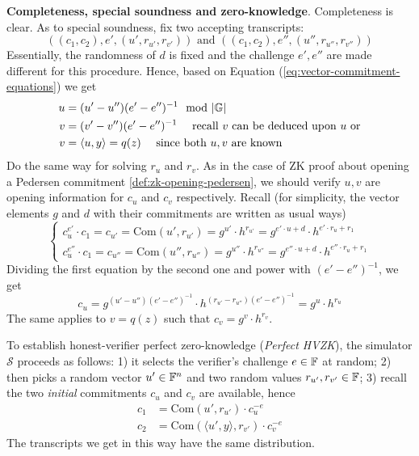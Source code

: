\documentclass{article}
\begin{document}
\textbf{Completeness, special soundness and zero-knowledge}. Completeness is clear. As to special soundness, fix two accepting transcripts:
\begin{equation*}
\left( (c_1, c_2), e', (u', r_{u'}, r_{v'}) \right) \text{ and } \left( (c_1, c_2), e'', (u'', r_{u''}, r_{v''}) \right)
\end{equation*}
Essentially, the randomness of $d$ is fixed and the challenge $e', e''$ are made different for this procedure. Hence, based on Equation (\ref{eq:vector-commitment-equations}) we get
\begin{equation*}
\begin{split}
u & = (u' - u'') (e' - e'')^{-1}   \mod \abs{\mathbb{G}} \\
v & = (v' - v'') (e' - e'')^{-1}   \quad \text{ recall } v \text{ can be deduced upon } u \text{ or} \\
v & = \langle u, y \rangle = q(z)  \quad \text{ since both } u, v \text{ are known}
\end{split}
\end{equation*}
Do the same way for solving $r_u$ and $r_v$. As in the case of ZK proof about opening a Pedersen commitment \ref{def:zk-opening-pedersen}, we should verify $u, v$ are opening information for $c_u$ and $c_v$ respectively. Recall (for simplicity, the vector elements $g$ and $d$ with their commitments are written as usual ways)
\begin{equation*}
\begin{cases}
c_u^{e'} \cdot c_1 = c_{u'} = \text{Com}(u', r_{u'}) = g^{u'} \cdot h^{r_{u'}} = g^{e' \cdot u + d} \cdot h^{e' \cdot r_u + r_1} \\
c_u^{e''} \cdot c_1 = c_{u''} = \text{Com}(u'', r_{u''}) = g^{u''} \cdot h^{r_{u''}} = g^{e'' \cdot u + d} \cdot h^{e'' \cdot r_u + r_1} 
\end{cases}
\end{equation*}
Dividing the first equation by the second one and power with $(e' - e'')^{-1}$, we get
\begin{equation*}
c_u = g^{(u' - u'') (e' - e'')^{-1}} \cdot h^{(r_{u'} - r_{u''}) (e' - e'')^{-1}} = g^u \cdot h^{r_u}
\end{equation*}
The same applies to $v = q(z)$ such that $c_v = g^v \cdot h^{r_v}$.

To establish honest-verifier perfect zero-knowledge (\textit{Perfect HVZK}), the simulator $\mathcal{S}$ proceeds as follows: 1) it selects the verifier's challenge $e \in \mathbb{F}$ at random; 2) then picks a random vector $u' \in \mathbb{F}^n$ and two random values $r_{u'}, r_{v'} \in \mathbb{F}$; 3) recall the two \textit{initial} commitments $c_u$ and $c_v$ are available, hence
\begin{equation*}
\begin{split}
c_1 & = \text{Com}(u', r_{u'}) \cdot c_u^{-e} \\
c_2 & = \text{Com}(\langle u', y \rangle, r_{v'}) \cdot c_v^{-e}
\end{split}
\end{equation*}
The transcripts we get in this way have the same distribution. 
\end{document}
